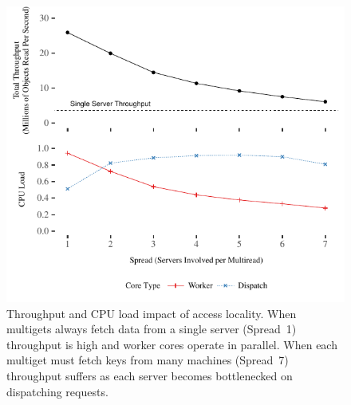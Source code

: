 \begin{figure}[t]
\centering
\includegraphics[width=1.0\columnwidth]{graphs/ramcloud-colocation.pdf}
\caption{Throughput and CPU load impact of access locality. When multigets
always fetch data from a single server (Spread~1) throughput is high and
worker cores operate in parallel. When each multiget must fetch keys from
many machines (Spread~7) throughput suffers as each server becomes
bottlenecked on dispatching requests.}
\label{fig:colocation}
\end{figure}
